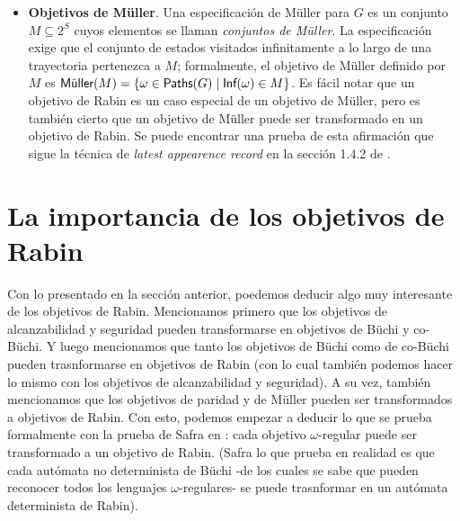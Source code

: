 \begin{itemize}
	\item \textbf{Objetivos de Müller}. Una especificación de Müller para \(G\) es un conjunto \(M\subseteq2^S\) cuyos elementos se llaman \emph{conjuntos de Müller}. La especificación exige que el conjunto de estados visitados infinitamente a lo largo de una trayectoria pertenezca a \(M\); formalmente, el objetivo de Müller definido por \(M\) es $\Muller(M)=\{\omega\in \Paths(G) \mid \Inf(\omega)\in M\}$. Es fácil notar que un objetivo de Rabin es un caso especial de un objetivo de Müller, pero es también cierto que un objetivo de Müller puede ser transformado en un objetivo de Rabin. Se puede encontrar una prueba de esta afirmación que sigue la técnica de \emph{latest appearence record} en la sección 1.4.2 de \cite{AutomataLogicsInfiniteGames}.

\end{itemize}





\section{La importancia de los objetivos de Rabin}

Con lo presentado en la sección anterior, poedemos deducir algo muy interesante
de los objetivos de Rabin. Mencionamos primero que los objetivos de
alcanzabilidad y seguridad pueden transformarse en objetivos de Büchi y
co-Büchi. Y luego mencionamos que tanto los objetivos de Büchi como de co-Büchi
pueden trasnformarse en objetivos de Rabin (con lo cual también podemos hacer
lo mismo con los objetivos de alcanzabilidad y seguridad). A su vez, también
mencionamos que los objetivos de paridad y de Müller pueden ser transformados a
objetivos de Rabin. Con esto, podemos empezar a deducir lo que se prueba
formalmente con la prueba de Safra en \cite{Safra}: cada objetivo
$\omega$-regular puede ser transformado a un objetivo de Rabin. (Safra lo que
prueba en realidad es que cada autómata no determinista de Büchi -de los cuales
se sabe que pueden reconocer todos los lenguajes $\omega$-regulares- se puede
trasnformar en un autómata determinista de Rabin).

